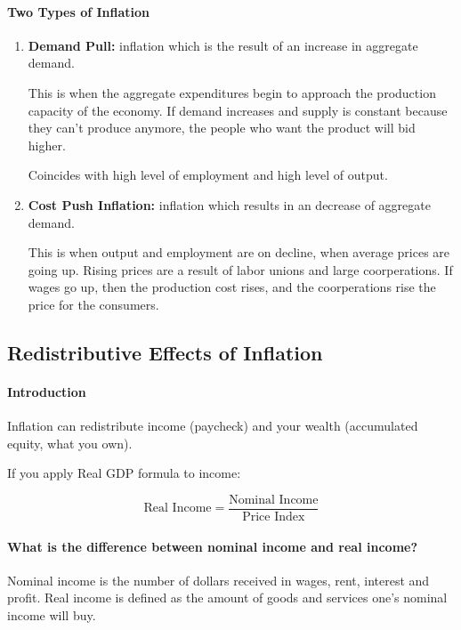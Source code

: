 
\paragraph{Two Types of Inflation}

\begin{enumerate}[label = (\arabic*)]
	\item \textbf{Demand Pull:} inflation which is the result of an increase in aggregate demand. 

		This is when the aggregate expenditures begin to approach the production capacity of the economy. If demand increases and supply is constant because they can't produce anymore, the people who want the product will bid higher.

		Coincides with high level of employment and high level of output.

	\item \textbf{Cost Push Inflation:} inflation which results in an decrease of aggregate demand.

		This is when output and employment are on decline, when average prices are going up. Rising prices are a result of labor unions and large coorperations. If wages go up, then the production cost rises, and the coorperations rise the price for the consumers.
	
\end{enumerate}

\subsection{Redistributive Effects of Inflation}

\paragraph{Introduction} Inflation can redistribute income (paycheck) and your wealth (accumulated equity, what you own).

If you apply Real GDP formula to income:

\[
	\text{Real Income} = \frac{\text{Nominal Income}}{\text{Price Index}}
\]

\paragraph{What is the difference between nominal income and real income?}
Nominal income is the number of dollars received in wages, rent, interest and profit. Real income is defined as the amount of goods and services one's nominal income will buy.

